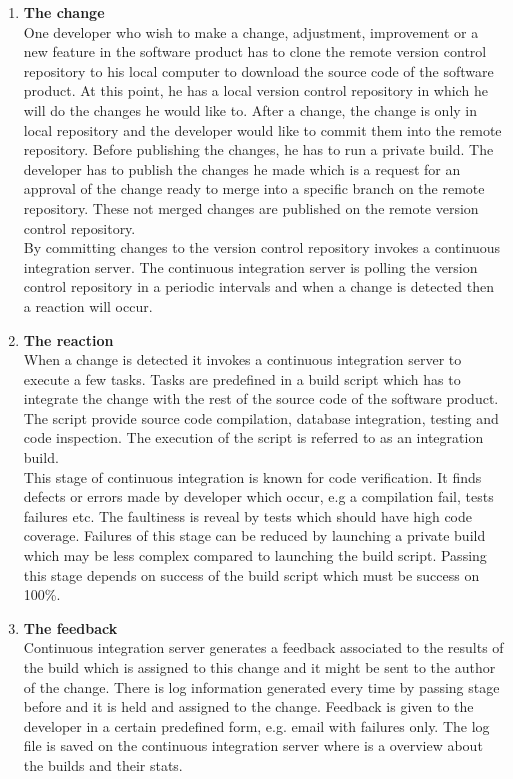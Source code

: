 \begin{enumerate}

	\item \textbf{The change}\\[0.1em]
		  One developer who wish to make a change, adjustment, improvement or a new feature in the software product has to clone the remote version control repository to his local computer to download the source code of the software product. At this point, he has a local version control repository in which he will do the changes he would like to. After a change, the change is only in local repository and the developer would like to commit them into the remote repository. Before publishing the changes, he has to run a private build. The developer has to publish the changes he made which is a request for an approval of the change ready to merge into a specific branch on the remote repository. These not merged changes are published on the remote version control repository.\\[0.1em]
		  By committing changes to the version control repository invokes a continuous integration server. The continuous integration server is polling the version control repository in a periodic intervals and when a change is detected then a reaction will occur.

	\item \textbf{The reaction}\\[0.1em]
		  When a change is detected it invokes a continuous integration server to execute a few tasks. Tasks are predefined in a build script which has to integrate the change with the rest of the source code of the software product. The script provide source code compilation, database integration, testing and code inspection. The execution of the script is referred to as an integration build.\\[0.1em]
		  This stage of continuous integration is known for code verification. It finds defects or errors made by developer which occur, e.g a compilation fail, tests failures etc. The faultiness is reveal by tests which should have high code coverage. Failures of this stage can be reduced by launching a private build which may be less complex compared to launching the build script. Passing this stage depends on success of the build script which must be success on 100\%.

	\item \textbf{The feedback}\\[0.1em]
		  Continuous integration server generates a feedback associated to the results of the build which is assigned to this change and it might be sent to the author of the change. There is log information generated every time by passing stage before and it is held and assigned to the change. Feedback is given to the developer in a certain predefined form, e.g. email with failures only. The log file is saved on the continuous integration server where is a overview about the builds and their stats.


\end{enumerate}
